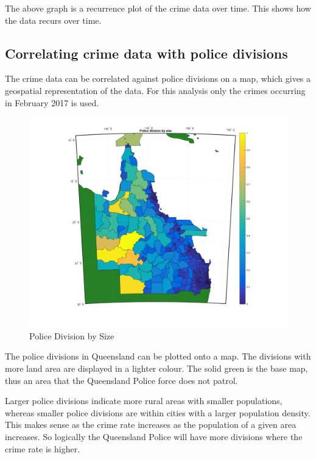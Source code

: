 \documentclass[]{article}
\begin{document}
The above graph is a recurrence plot of the crime data over time.
This shows how the data recurs over time.

\subsection{Correlating crime data with police divisions}

The crime data can be correlated against police divisions on a map, which gives a
geospatial representation of the data.
For this analysis only the crimes occurring in February 2017 is used.

\begin{figure}[H]
    \caption{Police Division by Size}
    \centering
    \label{fig:police_divisions}
    \includegraphics[width=\linewidth]{../images/police_division_by_size}
\end{figure}

The police divisions in Queensland can be plotted onto a map. The divisions with more land area are displayed in a lighter colour. The solid green is the base map, thus an area that the Queensland Police force does not patrol.

Larger police divisions indicate more rural areas with smaller populations, whereas smaller police divisions are within cities with a larger population density.
This makes sense as the crime rate increases as the population of a given area increases\cite{nolan_establishing_2004}.
So logically the Queensland Police will have more divisions where the crime rate is higher.
\end{document}
